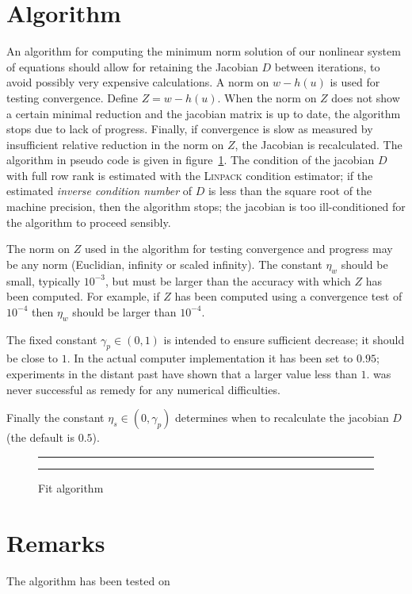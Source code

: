 \documentclass[english,memorandum,old,sectionpage]{cpbart}
\newenvironment{Rfigure}%
{\begin{figure}\rule{\linewidth}{0.1mm}}%
{\rule{\linewidth}{0.1mm}\end{figure}}%
\begin{document}
\newpage

\section{Algorithm}

An algorithm for computing the minimum norm solution of our nonlinear
system of equations should allow for retaining the Jacobian $D$
between iterations, to avoid possibly very expensive calculations.
A norm on $w - h(u)$ is used for testing
convergence. Define $Z=w-h(u)$.
When the norm on $Z$ does not show a certain minimal reduction and the jacobian
matrix is up to date, the algorithm stops due to lack of progress.
Finally, if convergence is slow as measured by insufficient relative
reduction in the norm on $Z$, the Jacobian is recalculated.
The algorithm in pseudo code is given in figure~\ref{figalg}.
The condition of the jacobian $D$ with full row rank is estimated
with the \textsc{Linpack} condition estimator;
if the estimated \emph{inverse condition number} of $D$ is
less than the square root of the machine precision, then
the algorithm stops; the jacobian is too ill-conditioned for
the algorithm to proceed sensibly.

The norm on $Z$ used in the algorithm for testing
convergence and progress may be any norm (Euclidian, infinity or scaled
infinity).
The constant $\eta_w$ should be small, typically $10^{-3}$, but must
be larger than the accuracy with which
$Z$ has been computed. For example, if $Z$ has been computed using a
convergence test of $10^{-4}$ then $\eta_w$ should be larger than $10^{-4}$.

The fixed constant $\gamma_p \in (0,1)$
is intended to ensure sufficient decrease;
it should be close to $1$. In the actual computer implementation
it has been set to $0.95$; experiments in the distant past
have shown that a larger value less than $1.$ was never
successful as remedy for any numerical difficulties.

Finally the constant $\eta_s \in (0,\gamma_p)$ determines when to
recalculate the jacobian $D$ (the default is $0.5$).


\begin{Rfigure}
\caption{Fit algorithm}\label{figalg}

\end{Rfigure}

\clearpage
\section{Remarks}
The algorithm has been tested on
\end{document}
